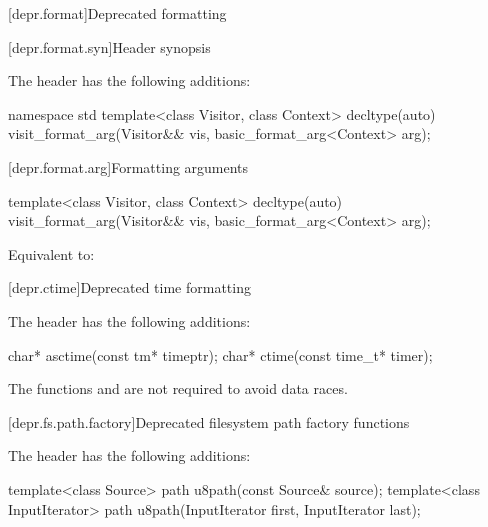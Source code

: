 [depr.format]{Deprecated formatting}

[depr.format.syn]{Header  synopsis}

\pnum
The header  has the following additions:

\begin{codeblock}
namespace std {
  template<class Visitor, class Context>
    decltype(auto) visit_format_arg(Visitor&& vis, basic_format_arg<Context> arg);
}
\end{codeblock}

[depr.format.arg]{Formatting arguments}

%
\begin{itemdecl}
template<class Visitor, class Context>
  decltype(auto) visit_format_arg(Visitor&& vis, basic_format_arg<Context> arg);
\end{itemdecl}

\begin{itemdescr}
\pnum
\effects
Equivalent to: 
\end{itemdescr}

[depr.ctime]{Deprecated time formatting}

\pnum
The header  has the following additions:
\begin{codeblock}
char* asctime(const tm* timeptr);
char* ctime(const time_t* timer);
\end{codeblock}

\pnum
The functions  and 
are not required to avoid data races.


[depr.fs.path.factory]{Deprecated filesystem path factory functions}

\pnum
The header  has the following additions:

%
\begin{itemdecl}
template<class Source>
  path u8path(const Source& source);
template<class InputIterator>
  path u8path(InputIterator first, InputIterator last);
\end{itemdecl}

